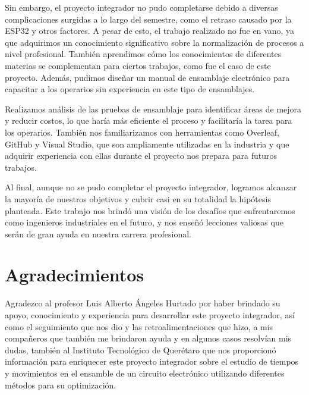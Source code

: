     Sin embargo, el proyecto integrador no pudo completarse debido a diversas complicaciones surgidas a lo largo del semestre, como el retraso causado por la ESP32 y otros factores. A pesar de esto, el trabajo realizado no fue en vano, ya que adquirimos un conocimiento significativo sobre la normalización de procesos a nivel profesional. También aprendimos cómo los conocimientos de diferentes materias se complementan para ciertos trabajos, como fue el caso de este proyecto. Además, pudimos diseñar un manual de ensamblaje electrónico para capacitar a los operarios sin experiencia en este tipo de ensamblajes.
    
    Realizamos análisis de las pruebas de ensamblaje para identificar áreas de mejora y reducir costos, lo que haría más eficiente el proceso y facilitaría la tarea para los operarios. También nos familiarizamos con herramientas como Overleaf, GitHub y Visual Studio, que son ampliamente utilizadas en la industria y que adquirir experiencia con ellas durante el proyecto nos prepara para futuros trabajos.
    
    Al final, aunque no se pudo completar el proyecto integrador, logramos alcanzar la mayoría de nuestros objetivos y cubrir casi en su totalidad la hipótesis planteada. Este trabajo nos brindó una visión de los desafíos que enfrentaremos como ingenieros industriales en el futuro, y nos enseñó lecciones valiosas que serán de gran ayuda en nuestra carrera profesional.
    
    \section{Agradecimientos}
    
    Agradezco al profesor Luis Alberto Ángeles Hurtado por haber brindado su apoyo, conocimiento y experiencia para desarrollar este proyecto integrador, así como el seguimiento que nos dio y las retroalimentaciones que hizo, a mis compañeros que también me brindaron ayuda y en algunos casos resolvían mis dudas, también al Instituto Tecnológico de Querétaro que nos proporcionó información para enriquecer este proyecto integrador sobre el estudio de tiempos y movimientos en el ensamble de un circuito electrónico utilizando diferentes métodos para su optimización. 
    
    
